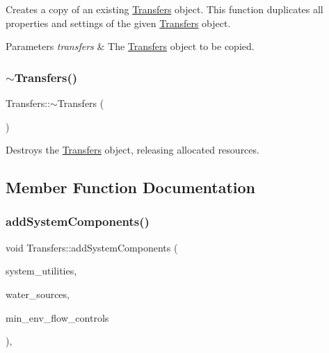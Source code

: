 Creates a copy of an existing \mbox{\hyperlink{classTransfers}{Transfers}} object. This function duplicates all properties and settings of the given \mbox{\hyperlink{classTransfers}{Transfers}} object. 


\begin{DoxyParams}{Parameters}
{\em transfers} & The \mbox{\hyperlink{classTransfers}{Transfers}} object to be copied. \\
\hline
\end{DoxyParams}
\mbox{\label{classTransfers_a5dfeafe7a9b9a446b1ab746b65ef3b4b}} 
\subsubsection{\texorpdfstring{$\sim$\+Transfers()}{~Transfers()}}
{\footnotesize\ttfamily Transfers\+::$\sim$\+Transfers (\begin{DoxyParamCaption}{ }\end{DoxyParamCaption})}



Destroys the \mbox{\hyperlink{classTransfers}{Transfers}} object, releasing allocated resources. 



\subsection{Member Function Documentation}
\mbox{\label{classTransfers_a3c1930dbeb1273c1c0be93ad5ca57357}} 
\subsubsection{\texorpdfstring{add\+System\+Components()}{addSystemComponents()}}
{\footnotesize\ttfamily void Transfers\+::add\+System\+Components (\begin{DoxyParamCaption}\item[{vector$<$ \mbox{\hyperlink{classUtility}{Utility}} $\ast$$>$}]{system\+\_\+utilities,  }\item[{vector$<$ \mbox{\hyperlink{classWaterSource}{Water\+Source}} $\ast$$>$}]{water\+\_\+sources,  }\item[{vector$<$ \mbox{\hyperlink{classMinEnvFlowControl}{Min\+Env\+Flow\+Control}} $\ast$$>$}]{min\+\_\+env\+\_\+flow\+\_\+controls }\end{DoxyParamCaption})\hspace{0.3cm}{\ttfamily [override]}, {\ttfamily [virtual]}}



